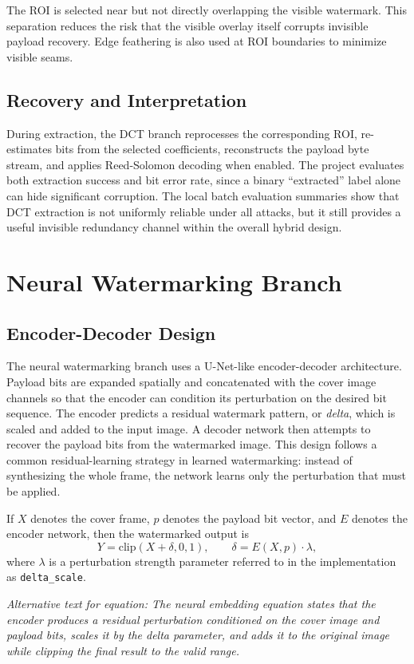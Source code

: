 \documentclass[12pt,oneside]{report}
\newcommand{\FormulaAlt}[1]{\par\small\textit{Alternative text for equation: #1}\normalsize}
\begin{document}
The ROI is selected near but not directly overlapping the visible watermark. This separation reduces the risk that the visible overlay itself corrupts invisible payload recovery. Edge feathering is also used at ROI boundaries to minimize visible seams.

\subsection{Recovery and Interpretation}
During extraction, the DCT branch reprocesses the corresponding ROI, re-estimates bits from the selected coefficients, reconstructs the payload byte stream, and applies Reed-Solomon decoding when enabled. The project evaluates both extraction success and bit error rate, since a binary ``extracted'' label alone can hide significant corruption. The local batch evaluation summaries show that DCT extraction is not uniformly reliable under all attacks, but it still provides a useful invisible redundancy channel within the overall hybrid design.

\section{Neural Watermarking Branch}
\subsection{Encoder-Decoder Design}
The neural watermarking branch uses a U-Net-like encoder-decoder architecture. Payload bits are expanded spatially and concatenated with the cover image channels so that the encoder can condition its perturbation on the desired bit sequence. The encoder predicts a residual watermark pattern, or \textit{delta}, which is scaled and added to the input image. A decoder network then attempts to recover the payload bits from the watermarked image. This design follows a common residual-learning strategy in learned watermarking: instead of synthesizing the whole frame, the network learns only the perturbation that must be applied.

If $X$ denotes the cover frame, $p$ denotes the payload bit vector, and $E$ denotes the encoder network, then the watermarked output is
\begin{equation}
Y = \mathrm{clip}\left(X + \delta, 0, 1\right), \qquad \delta = E(X,p)\cdot \lambda,
\end{equation}
where $\lambda$ is a perturbation strength parameter referred to in the implementation as \texttt{delta\_scale}.
\FormulaAlt{The neural embedding equation states that the encoder produces a residual perturbation conditioned on the cover image and payload bits, scales it by the delta parameter, and adds it to the original image while clipping the final result to the valid range.}
\end{document}
